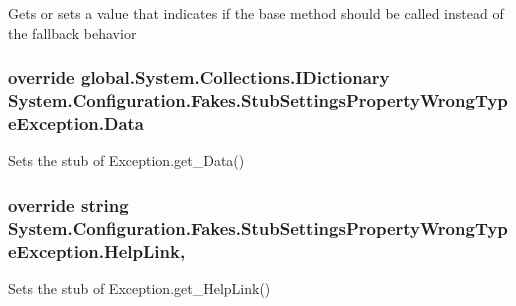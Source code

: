 Gets or sets a value that indicates if the base method should be called instead of the fallback behavior

\hypertarget{class_system_1_1_configuration_1_1_fakes_1_1_stub_settings_property_wrong_type_exception_a9db3267a70ea4cbe39c4210c99755aaa}{
\subsubsection[{Data}]{\setlength{\rightskip}{0pt plus 5cm}override global.\-System.\-Collections.\-I\-Dictionary System.\-Configuration.\-Fakes.\-Stub\-Settings\-Property\-Wrong\-Type\-Exception.\-Data\hspace{0.3cm}{\ttfamily [get]}}}\label{class_system_1_1_configuration_1_1_fakes_1_1_stub_settings_property_wrong_type_exception_a9db3267a70ea4cbe39c4210c99755aaa}


Sets the stub of Exception.\-get\-\_\-\-Data()

\hypertarget{class_system_1_1_configuration_1_1_fakes_1_1_stub_settings_property_wrong_type_exception_a2eb66fcfa04624ccb172dd3a8207e79e}{
\subsubsection[{Help\-Link}]{\setlength{\rightskip}{0pt plus 5cm}override string System.\-Configuration.\-Fakes.\-Stub\-Settings\-Property\-Wrong\-Type\-Exception.\-Help\-Link\hspace{0.3cm}{\ttfamily [get]}, {\ttfamily [set]}}}\label{class_system_1_1_configuration_1_1_fakes_1_1_stub_settings_property_wrong_type_exception_a2eb66fcfa04624ccb172dd3a8207e79e}


Sets the stub of Exception.\-get\-\_\-\-Help\-Link()

